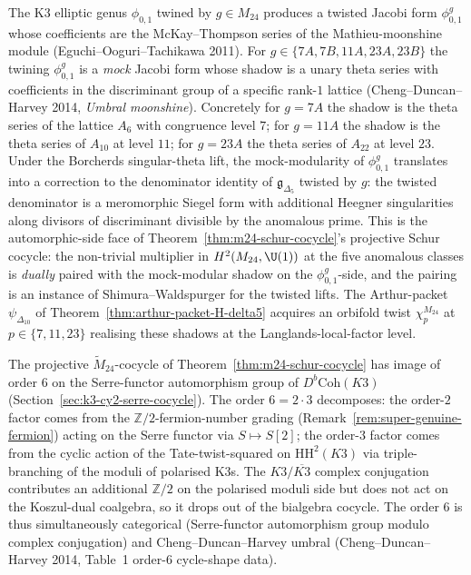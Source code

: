 \begin{remark}
\label{rem:cdh-umbral-mock-modular-shadows}
The K3 elliptic genus $\phi_{0,1}$ twined by $g\in M_{24}$ produces a twisted Jacobi
form $\phi^g_{0,1}$ whose coefficients are the McKay--Thompson series of the
Mathieu-moonshine module (Eguchi--Ooguri--Tachikawa 2011). For
$g\in\{7A, 7B, 11A, 23A, 23B\}$ the twining $\phi^g_{0,1}$ is a \emph{mock} Jacobi
form whose shadow is a unary theta series with coefficients in the discriminant group
of a specific rank-$1$ lattice (Cheng--Duncan--Harvey 2014, \emph{Umbral moonshine}).
Concretely for $g = 7A$ the shadow is the theta series of the lattice $A_6$ with
congruence level $7$; for $g = 11A$ the shadow is the theta series of $A_{10}$ at
level $11$; for $g = 23A$ the theta series of $A_{22}$ at level $23$. Under the
Borcherds singular-theta lift, the mock-modularity of $\phi^g_{0,1}$ translates into a
correction to the denominator identity of $\mathfrak{g}_{\Delta_5}$ twisted by $g$:
the twisted denominator is a meromorphic Siegel form with additional Heegner
singularities along divisors of discriminant divisible by the anomalous prime. This
is the automorphic-side face of Theorem~\ref{thm:m24-schur-cocycle}'s projective
Schur cocycle: the non-trivial multiplier in $H^2(M_{24},\U(1))$ at the five
anomalous classes is \emph{dually} paired with the mock-modular shadow on the
$\phi^g_{0,1}$-side, and the pairing is an instance of Shimura--Waldspurger for the
twisted lifts. The Arthur-packet $\psi_{\Delta_{10}}$ of
Theorem~\ref{thm:arthur-packet-H-delta5} acquires an orbifold twist $\chi^{M_{24}}_p$
at $p\in\{7, 11, 23\}$ realising these shadows at the Langlands-local-factor level.
\end{remark}

\begin{remark}
\label{rem:schur-multiplier-M24-Z12}
The projective $\widetilde{M}_{24}$-cocycle of Theorem~\ref{thm:m24-schur-cocycle}
has image of order $6$ on the Serre-functor automorphism group of
$D^b\mathrm{Coh}(K3)$ (Section~\ref{sec:k3-cy2-serre-cocycle}). The order $6 = 2\cdot 3$
decomposes:
the order-$2$ factor comes from the $\mathbb{Z}/2$-fermion-number grading
(Remark~\ref{rem:super-genuine-fermion}) acting on the Serre functor via
$S\mapsto S[2]$; the order-$3$ factor comes from the cyclic action of the
Tate-twist-squared on $\mathrm{HH}^2(K3)$ via triple-branching of the moduli of
polarised K3s. The $K3/\overline{K3}$ complex conjugation contributes an
additional $\mathbb{Z}/2$ on the polarised moduli side but does not act on the
Koszul-dual coalgebra, so it drops out of the bialgebra cocycle. The order $6$
is thus simultaneously categorical (Serre-functor automorphism group modulo
complex conjugation) and Cheng--Duncan--Harvey umbral
(Cheng--Duncan--Harvey 2014, Table~1 order-$6$ cycle-shape data).
\end{remark}

